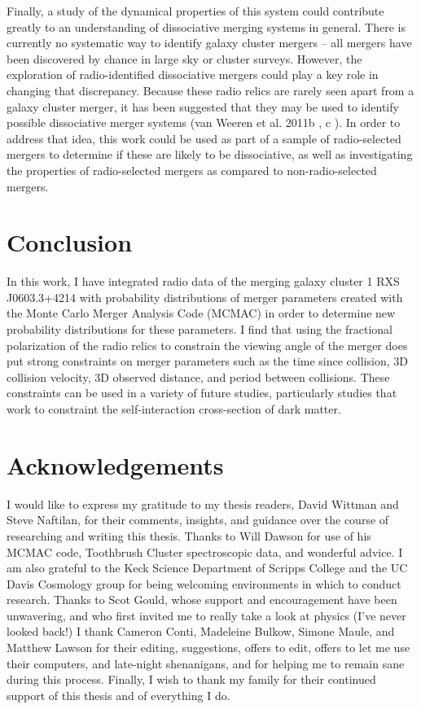 \documentclass[12 pt]{article}
\begin{document}
Finally, a study of the dynamical properties of this system could contribute greatly to an understanding of dissociative merging systems in general. There is currently no systematic way to identify galaxy cluster mergers – all mergers have been discovered by chance in large sky or cluster surveys. However, the exploration of radio-identified dissociative mergers could play a key role in changing that discrepancy. Because these radio relics are rarely seen apart from a galaxy cluster merger, it has been suggested that they may be used to identify possible dissociative merger systems (van Weeren et al. 2011b \cite{reinout11b}, c \cite{reinout11c}). In order to address that idea, this work could be used as part of a sample of radio-selected mergers to determine if these are likely to be dissociative, as well as investigating the properties of radio-selected mergers as compared to non-radio-selected mergers. 

\newpage
\section{Conclusion}

In this work, I have integrated radio data of the merging galaxy cluster 1 RXS J0603.3+4214 with probability distributions of merger parameters created with the Monte Carlo Merger Analysis Code (MCMAC) in order to determine new probability distributions for these parameters. I find that using the fractional polarization of the radio relics to constrain the viewing angle of the merger does put strong constraints on merger parameters such as the time since collision, 3D collision velocity, 3D observed distance, and period between collisions. These constraints can be used in a variety of future studies, particularly studies that work to constraint the self-interaction cross-section of dark matter.

\newpage
\section*{Acknowledgements}

I would like to express my gratitude to my thesis readers, David Wittman and Steve Naftilan, for their comments, insights, and guidance over the course of researching and writing this thesis. Thanks to Will Dawson for use of his MCMAC code, Toothbrush Cluster spectroscopic data, and wonderful advice. I am also grateful to the Keck Science Department of Scripps College and the UC Davis Cosmology group for being welcoming environments in which to conduct research. Thanks to Scot Gould, whose support and encouragement have been unwavering, and who first invited me to really take a look at physics (I've never looked back!) I thank Cameron Conti, Madeleine Bulkow, Simone Maule, and Matthew Lawson for their editing, suggestions, offers to edit, offers to let me use their computers, and late-night shenanigans, and for helping me to remain sane during this process. Finally, I wish to thank my family for their continued support of this thesis and of everything I do.
\end{document}
